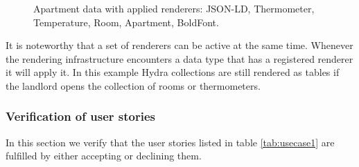 \begin{figure}[!htb]
  \caption{Apartment data with applied renderers: JSON-LD, Thermometer, Temperature, Room, Apartment, BoldFont.}
\end{figure}

It is noteworthy that a set of renderers can be active at the same time. Whenever the rendering infrastructure encounters a data type that has a registered renderer it will apply it. In this example Hydra collections are still rendered as tables if the landlord opens the collection of rooms or thermometers.

\subsubsection{Verification of user stories}
In this section we verify that the user stories listed in table \ref{tab:usecase1} are fulfilled by either accepting or declining them.

